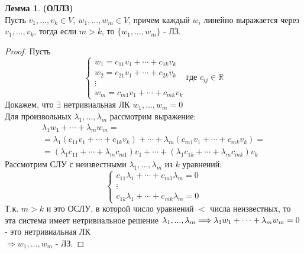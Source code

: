 \documentclass[a4paper, 12pt]{article}
\newcommand{\R}{\mathbb R}
\newcounter{lemcount}
\newcounter{lemcount2}
\theoremstyle{definition}
\newtheorem{lemmanum}[lemcount]{Лемма}
\begin{document}
  \begin{lemmanum} \textbf{(ОЛЛЗ)}  \\
    Пусть $v_1,...,v_k \in V, \ w_1,...,w_m \in V$, причем каждый $w_i$ линейно выражается через $v_1,...,v_k$, тогда если $m>k$, то $\{w_1,...,w_m\}$ - ЛЗ.  
  \end{lemmanum} 
  \begin{proof}
    Пусть 
    $$\begin{cases}
      w_1 = c_{11}v_1+\cdots+c_{1k}v_k \\
      w_2 = c_{21}v_1+\cdots+c_{2k}v_k \\
      \vdots \\
      w_m = c_{m1}v_1+\cdots+c_{mk}v_k
    \end{cases}
    \text{где } c_{ij} \in \R
    $$
    Докажем, что $\exists$ нетривиальная ЛК $w_1,...,w_m=0$ \\
    Для произвольных $\lambda_1,...,\lambda_m$ рассмотрим выражение: 
    \begin{multline*}
      \lambda_1w_1 +\cdots+\lambda_mw_m = \\ = \lambda_1(c_{11}v_1+\cdots+c_{1k}v_k) + \cdots + \lambda_m(c_{m1}v_1+\cdots+c_{mk}v_k) = \\ = (\lambda_1c_{11}+\cdots+\lambda_mc_{m1})v_1+\cdots+(\lambda_1c_{1k}+\cdots+\lambda_mc_{mk})v_k 
    \end{multline*}
    Рассмотрим СЛУ с неизвестными $\lambda_1,...,\lambda_m$ из $k$ уравнений:
    $$\begin{cases}
      c_{11}\lambda_1+\cdots+c_{m1}\lambda_m=0 \\
      \vdots \\
      c_{1k}\lambda_1+\cdots+c_{mk}\lambda_m=0
    \end{cases}$$ 
    Т.к. $m>k$ и это ОСЛУ, в которой число уравнений $<$ числа неизвестных, то эта система имеет нетривиальное решение 
    $\lambda_1,...,\lambda_m \\ \Longrightarrow \lambda_1w_1+\cdots+\lambda_mw_m = 0$ - это нетривиальная ЛК \\ $\Longrightarrow w_1,...,w_m$ - ЛЗ. 
  \end{proof} 
\end{document}
